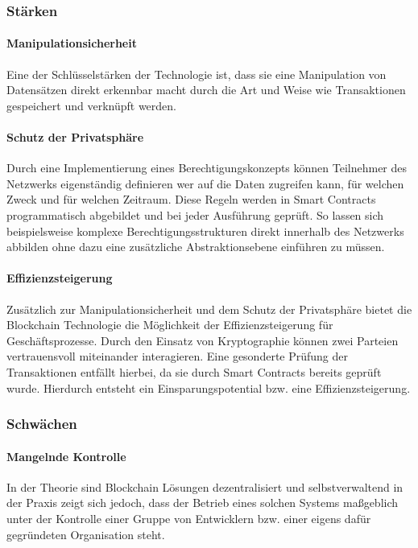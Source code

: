 \subsubsection{Stärken}
\paragraph{Manipulationsicherheit}
Eine der Schlüsselstärken der Technologie ist, dass sie eine Manipulation von Datensätzen direkt erkennbar macht durch die Art und Weise wie Transaktionen gespeichert und verknüpft werden.

\paragraph{Schutz der Privatsphäre}
Durch eine Implementierung eines Berechtigungskonzepts können Teilnehmer des Netzwerks eigenständig definieren wer auf die Daten zugreifen kann, für welchen Zweck und für welchen Zeitraum. Diese Regeln werden in Smart Contracts programmatisch abgebildet und bei jeder Ausführung geprüft. So lassen sich beispielsweise komplexe Berechtigungsstrukturen direkt innerhalb des Netzwerks abbilden ohne dazu eine zusätzliche Abstraktionsebene einführen zu müssen. 

\paragraph{Effizienzsteigerung}
Zusätzlich zur Manipulationsicherheit und dem Schutz der Privatsphäre bietet die Blockchain Technologie die Möglichkeit der Effizienzsteigerung für Geschäftsprozesse. Durch den Einsatz von Kryptographie können zwei Parteien vertrauensvoll miteinander interagieren. Eine gesonderte Prüfung der Transaktionen entfällt hierbei, da sie durch Smart Contracts bereits geprüft wurde. Hierdurch entsteht ein Einsparungspotential bzw. eine Effizienzsteigerung.

\subsubsection{Schwächen}
\paragraph{Mangelnde Kontrolle}
In der Theorie sind Blockchain Lösungen dezentralisiert und selbstverwaltend \citep[siehe auch][]{Nakamoto2009} in der Praxis zeigt sich jedoch, dass der Betrieb eines solchen Systems maßgeblich unter der Kontrolle einer Gruppe von Entwicklern bzw. einer eigens dafür gegründeten Organisation steht.

